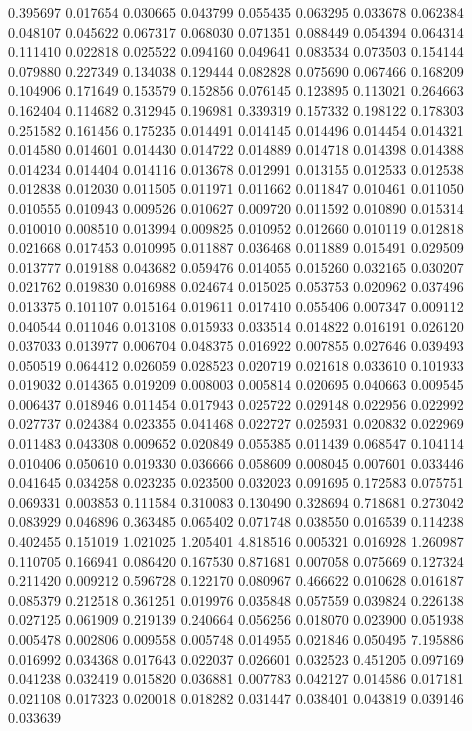 0.395697
0.017654
0.030665
0.043799
0.055435
0.063295
0.033678
0.062384
0.048107
0.045622
0.067317
0.068030
0.071351
0.088449
0.054394
0.064314
0.111410
0.022818
0.025522
0.094160
0.049641
0.083534
0.073503
0.154144
0.079880
0.227349
0.134038
0.129444
0.082828
0.075690
0.067466
0.168209
0.104906
0.171649
0.153579
0.152856
0.076145
0.123895
0.113021
0.264663
0.162404
0.114682
0.312945
0.196981
0.339319
0.157332
0.198122
0.178303
0.251582
0.161456
0.175235
0.014491
0.014145
0.014496
0.014454
0.014321
0.014580
0.014601
0.014430
0.014722
0.014889
0.014718
0.014398
0.014388
0.014234
0.014404
0.014116
0.013678
0.012991
0.013155
0.012533
0.012538
0.012838
0.012030
0.011505
0.011971
0.011662
0.011847
0.010461
0.011050
0.010555
0.010943
0.009526
0.010627
0.009720
0.011592
0.010890
0.015314
0.010010
0.008510
0.013994
0.009825
0.010952
0.012660
0.010119
0.012818
0.021668
0.017453
0.010995
0.011887
0.036468
0.011889
0.015491
0.029509
0.013777
0.019188
0.043682
0.059476
0.014055
0.015260
0.032165
0.030207
0.021762
0.019830
0.016988
0.024674
0.015025
0.053753
0.020962
0.037496
0.013375
0.101107
0.015164
0.019611
0.017410
0.055406
0.007347
0.009112
0.040544
0.011046
0.013108
0.015933
0.033514
0.014822
0.016191
0.026120
0.037033
0.013977
0.006704
0.048375
0.016922
0.007855
0.027646
0.039493
0.050519
0.064412
0.026059
0.028523
0.020719
0.021618
0.033610
0.101933
0.019032
0.014365
0.019209
0.008003
0.005814
0.020695
0.040663
0.009545
0.006437
0.018946
0.011454
0.017943
0.025722
0.029148
0.022956
0.022992
0.027737
0.024384
0.023355
0.041468
0.022727
0.025931
0.020832
0.022969
0.011483
0.043308
0.009652
0.020849
0.055385
0.011439
0.068547
0.104114
0.010406
0.050610
0.019330
0.036666
0.058609
0.008045
0.007601
0.033446
0.041645
0.034258
0.023235
0.023500
0.032023
0.091695
0.172583
0.075751
0.069331
0.003853
0.111584
0.310083
0.130490
0.328694
0.718681
0.273042
0.083929
0.046896
0.363485
0.065402
0.071748
0.038550
0.016539
0.114238
0.402455
0.151019
1.021025
1.205401
4.818516
0.005321
0.016928
1.260987
0.110705
0.166941
0.086420
0.167530
0.871681
0.007058
0.075669
0.127324
0.211420
0.009212
0.596728
0.122170
0.080967
0.466622
0.010628
0.016187
0.085379
0.212518
0.361251
0.019976
0.035848
0.057559
0.039824
0.226138
0.027125
0.061909
0.219139
0.240664
0.056256
0.018070
0.023900
0.051938
0.005478
0.002806
0.009558
0.005748
0.014955
0.021846
0.050495
7.195886
0.016992
0.034368
0.017643
0.022037
0.026601
0.032523
0.451205
0.097169
0.041238
0.032419
0.015820
0.036881
0.007783
0.042127
0.014586
0.017181
0.021108
0.017323
0.020018
0.018282
0.031447
0.038401
0.043819
0.039146
0.033639
